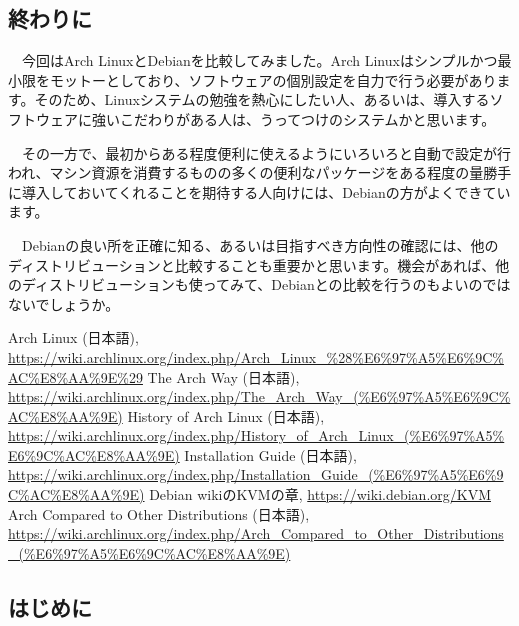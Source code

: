 \documentclass[mingoth,a4paper]{jsarticle}
\begin{document}
\subsection{終わりに}

　今回はArch LinuxとDebianを比較してみました。Arch Linuxはシンプルかつ最小限をモットーとしており、ソフトウェアの個別設定を自力で行う必要があります。そのため、Linuxシステムの勉強を熱心にしたい人、あるいは、導入するソフトウェアに強いこだわりがある人は、うってつけのシステムかと思います。

　その一方で、最初からある程度便利に使えるようにいろいろと自動で設定が行われ、マシン資源を消費するものの多くの便利なパッケージをある程度の量勝手に導入しておいてくれることを期待する人向けには、Debianの方がよくできています。

　Debianの良い所を正確に知る、あるいは目指すべき方向性の確認には、他のディストリビューションと比較することも重要かと思います。機会があれば、他のディストリビューションも使ってみて、Debianとの比較を行うのもよいのではないでしょうか。

\begin{thebibliography}{9}
 Arch Linux (日本語), \url{https://wiki.archlinux.org/index.php/Arch_Linux_%28%E6%97%A5%E6%9C%AC%E8%AA%9E%29}
 The Arch Way (日本語), \url{https://wiki.archlinux.org/index.php/The_Arch_Way_(%E6%97%A5%E6%9C%AC%E8%AA%9E)}
 History of Arch Linux (日本語), \url{https://wiki.archlinux.org/index.php/History_of_Arch_Linux_(%E6%97%A5%E6%9C%AC%E8%AA%9E)}
Installation Guide (日本語), \url{https://wiki.archlinux.org/index.php/Installation_Guide_(%E6%97%A5%E6%9C%AC%E8%AA%9E)}
 Debian wikiのKVMの章, \url{https://wiki.debian.org/KVM}
 Arch Compared to Other Distributions (日本語), \url{https://wiki.archlinux.org/index.php/Arch_Compared_to_Other_Distributions_(%E6%97%A5%E6%9C%AC%E8%AA%9E)}
\end{thebibliography}

 

 \subsection{はじめに}
\end{document}
